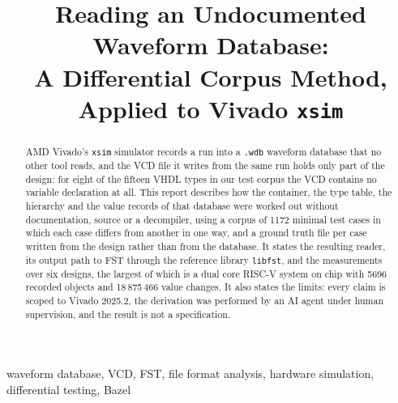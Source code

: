 \documentclass[conference]{IEEEtran}
\begin{document}
\title{Reading an Undocumented Waveform Database:\\
A Differential Corpus Method, Applied to Vivado \texttt{xsim}}

\author{
}

\maketitle

\begin{abstract}
AMD Vivado's \texttt{xsim} simulator records a run into a
\texttt{.wdb} waveform database that no other tool reads, and the VCD
file it writes from the same run holds only part of the design: for
eight of the fifteen VHDL types in our test corpus the VCD contains no
variable declaration at all. This report describes how the container,
the type table, the hierarchy and the value records of that database
were worked out without documentation, source or a decompiler, using a
corpus of 1172 minimal test cases in which each case differs from
another in one way, and a ground truth file per case written from the
design rather than from the database. It states the resulting reader,
its output path to FST through the reference library \texttt{libfst},
and the measurements over six designs, the largest of which is a dual
core RISC-V system on chip with 5696 recorded objects and 18\,875\,466
value changes. It also states the limits: every claim is scoped to
Vivado 2025.2, the derivation was performed by an AI agent under human
supervision, and the result is not a specification.
\end{abstract}

\begin{IEEEkeywords}
waveform database, VCD, FST, file format analysis, hardware
simulation, differential testing, Bazel
\end{IEEEkeywords}









\balance
\end{document}
